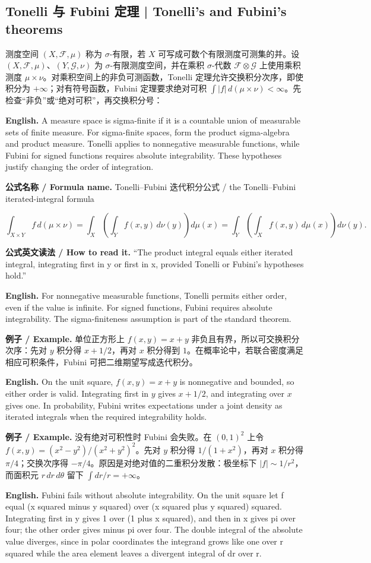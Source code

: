 \documentclass[UTF8,11pt,a4paper]{ctexart}
\newcommand{\EN}[1]{\par\noindent\textbf{English.} #1\par}
\newcommand{\READ}[1]{\par\noindent\textbf{公式英文读法 / How to read it.} #1\par}
\let\APSsubsection\subsection
\renewcommand{\subsection}[1]{\Needspace{6\baselineskip}\APSsubsection{#1}}
\newcommand{\FORMULA}[2]{\par\Needspace{3\baselineskip}\noindent\textbf{公式名称 / Formula name.} #1 / #2\par}
\newcommand{\EX}[2]{\par\noindent\textbf{例子 / Example.} #1\par\EN{#2}}
\begin{document}
\subsection{Tonelli 与 Fubini 定理 | Tonelli's and Fubini's theorems}
\noindent 测度空间 $(X,\mathcal F,\mu)$ 称为 $\sigma$-有限，若 $X$ 可写成可数个有限测度可测集的并。设 $(X,\mathcal F,\mu)$、$(Y,\mathcal G,\nu)$ 为 $\sigma$-有限测度空间，并在乘积 $\sigma$-代数 $\mathcal F\otimes\mathcal G$ 上使用乘积测度 $\mu\times\nu$。对乘积空间上的非负可测函数，Tonelli 定理允许交换积分次序，即使积分为 $+\infty$；对有符号函数，Fubini 定理要求绝对可积 $\int|f|\,d(\mu\times\nu)<\infty$。先检查“非负”或“绝对可积”，再交换积分号：
\EN{A measure space is sigma-finite if it is a countable union of measurable sets of finite measure. For sigma-finite spaces, form the product sigma-algebra and product measure. Tonelli applies to nonnegative measurable functions, while Fubini for signed functions requires absolute integrability. These hypotheses justify changing the order of integration.}
\FORMULA{Tonelli--Fubini 迭代积分公式}{the Tonelli--Fubini iterated-integral formula}
\[
\int_{X\times Y}f\,d(\mu\times\nu)
=\int_X\left(\int_Y f(x,y)\,d\nu(y)\right)d\mu(x)
=\int_Y\left(\int_X f(x,y)\,d\mu(x)\right)d\nu(y).
\]
\READ{“The product integral equals either iterated integral, integrating first in y or first in x, provided Tonelli or Fubini's hypotheses hold.”}
\EN{For nonnegative measurable functions, Tonelli permits either order, even if the value is infinite. For signed functions, Fubini requires absolute integrability. The sigma-finiteness assumption is part of the standard theorem.}
\EX{单位正方形上 $f(x,y)=x+y$ 非负且有界，所以可交换积分次序：先对 $y$ 积分得 $x+1/2$，再对 $x$ 积分得到 $1$。在概率论中，若联合密度满足相应可积条件，Fubini 可把二维期望写成迭代积分。}{On the unit square, $f(x,y)=x+y$ is nonnegative and bounded, so either order is valid. Integrating first in $y$ gives $x+1/2$, and integrating over $x$ gives one. In probability, Fubini writes expectations under a joint density as iterated integrals when the required integrability holds.}

\EX{没有绝对可积性时 Fubini 会失败。在 $(0,1)^2$ 上令 $f(x,y)=(x^2-y^2)/(x^2+y^2)^2$。先对 $y$ 积分得 $1/(1+x^2)$，再对 $x$ 积分得 $\pi/4$；交换次序得 $-\pi/4$。原因是对绝对值的二重积分发散：极坐标下 $|f|\sim1/r^2$，而面积元 $r\,dr\,d\theta$ 留下 $\int dr/r=+\infty$。}{Fubini fails without absolute integrability. On the unit square let f equal (x squared minus y squared) over (x squared plus y squared) squared. Integrating first in y gives 1 over (1 plus x squared), and then in x gives pi over four; the other order gives minus pi over four. The double integral of the absolute value diverges, since in polar coordinates the integrand grows like one over r squared while the area element leaves a divergent integral of dr over r.}
\end{document}
